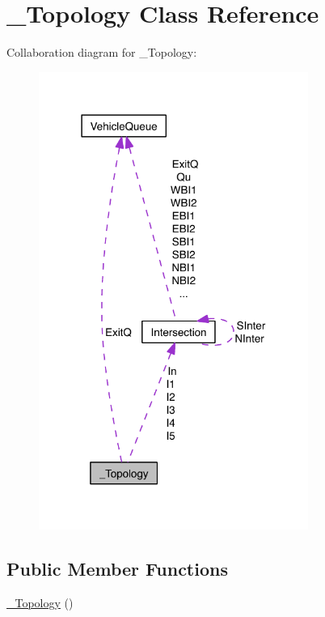\hypertarget{class___topology}{\section{\-\_\-\-Topology Class Reference}
\label{class___topology}
}


Collaboration diagram for \-\_\-\-Topology\-:\nopagebreak
\begin{figure}[H]
\begin{center}
\leavevmode
\includegraphics[width=250pt]{class___topology__coll__graph}
\end{center}
\end{figure}
\subsection*{Public Member Functions}
\begin{DoxyCompactItemize}
\item 
\hyperlink{class___topology_abe643100e153984647c440cd9ffdb50e}{\-\_\-\-Topology} ()
\end{DoxyCompactItemize}
